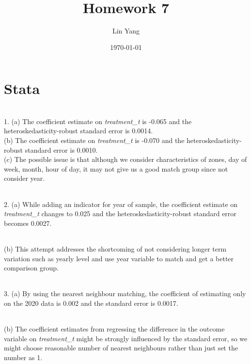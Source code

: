 \documentclass{article}
\title{Homework 7}
\author{Lin Yang}
\date{\today}
\begin{document}
\maketitle  
\section{Stata}
~\\
1. (a) 
The coefficient estimate on \textit{treatment\_t} is -0.065 and the heteroskedasticity-robust standard error is 0.0014. 
\\
(b) The coefficient estimate on \textit{treatment\_t} is -0.070 and the heteroskedasticity-robust standard error is 0.0010. 
\\
(c) The possible issue is that although we consider characteristics of zones, day of week, month, hour of day, it may not give us a good match group since not consider year. 


~\\
2. (a) While adding an indicator for year of sample, the coefficient estimate on \textit{treatment\_t} changes to 0.025 and the heteroskedasticity-robust standard error becomes 0.0027.

\\
(b) This attempt addresses the shortcoming of not considering longer term variation such as yearly level and use year variable to match and get a better comparison group. 

~\\
3. (a) By using the nearest neighbour matching, the coefficient of estimating only on the 2020 data is 0.002 and the standard error is 0.0017. 

~\\
(b) The coefficient estimates from regressing the difference in the outcome variable on \textit{treatment\_t} might be strongly influenced by the standard error, so we might choose reasonable number of nearest neighbours rather than just set the number as 1. 
\end{document}
